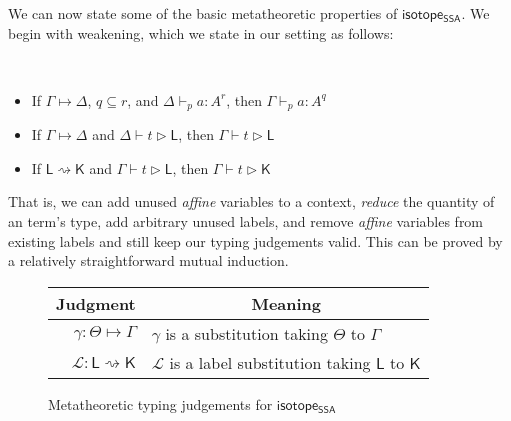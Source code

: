 \documentclass[acmsmall,screen,review]{acmart}
\newcommand{\mc}[1]{\ensuremath{\mathcal{#1}}}
\newcommand{\ms}[1]{\ensuremath{\mathsf{#1}}}
\newcommand{\cwk}[2]{#1 \mapsto #2}
\newcommand{\lwk}[2]{#1 \rightsquigarrow #2}
\newcommand{\hasty}[5]{#1 \vdash_{#2} #3: {#4}^{#5}}
\newcommand{\haslb}[3]{#1 \vdash #2 \rhd #3}
\newcommand{\lhaslb}[3]{#1 \vdash #2 \rhd #3}
\newcommand{\issubst}[3]{#1: #2 \mapsto #3}
\newcommand{\lbsubst}[3]{#1: #2 \rightsquigarrow #3}
\newcommand{\isotopessa}{\ms{isotope_{SSA}}}
\begin{document}
We can now state some of the basic metatheoretic properties of \isotopessa. We
begin with weakening, which we state in our setting as follows:
\begin{lemma}[Weakening] \
  \begin{itemize}
    \item If \(\cwk{\Gamma}{\Delta}\), \(q \subseteq r\), and
    \(\hasty{\Delta}{p}{a}{A}{r}\), then \(\hasty{\Gamma}{p}{a}{A}{q}\)
    \item If \(\cwk{\Gamma}{\Delta}\) and \(\haslb{\Delta}{t}{\ms{L}}\), then
    \(\haslb{\Gamma}{t}{\ms{L}}\)
    \item If \(\lwk{\ms{L}}{\ms{K}}\) and \(\haslb{\Gamma}{t}{\ms{L}}\), then \(\haslb{\Gamma}{t}{\ms{K}}\)
  \end{itemize}
\end{lemma}
That is, we can add unused \textit{affine} variables to a context,
\textit{reduce} the quantity of an term's type, add arbitrary unused labels, and
remove \textit{affine} variables from existing labels and still keep our typing
judgements valid. This can be proved by a relatively straightforward mutual
induction.

\begin{figure}
  \begin{center}        
    \begingroup
    \renewcommand{\arraystretch}{1.5}
    \setlength{\tabcolsep}{2em}
    \begin{tabular}{rl}
        \multicolumn{1}{c}{Judgment} & \multicolumn{1}{c}{Meaning} \\ \hline
        \(\issubst{\gamma}{\Theta}{\Gamma}\) &
        \(\gamma\) is a substitution taking \(\Theta\) to \(\Gamma\) \\
        \(\lbsubst{\mc{L}}{\ms{L}}{\ms{K}}\) &
        \(\mc{L}\) is a label substitution taking \(\ms{L}\) to \(\ms{K}\)
    \end{tabular}
    \endgroup
  \end{center}
  \caption{Metatheoretic typing judgements for \isotopessa}
  \label{fig:ssa-meta-judgements}
\end{figure}
\end{document}
